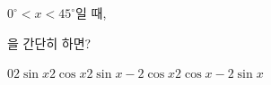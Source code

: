 $0^\circ<x<45^\circ$일 때,\par\smallskip{}\par\smallskip\noindent 을 간단히 하면?
\begin{choicesii}{$0$}{$2\sin x$}{$2\cos x$}{$2\sin x-2\cos x$}{$2\cos x-2\sin x$}\end{choicesii}
